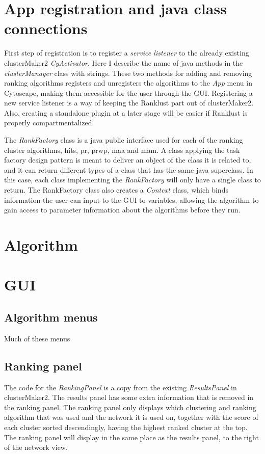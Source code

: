 \section{App registration and java class connections}
First step of registration is to register a \textit{service listener} to the
already existing clusterMaker2 \textit{CyActivator}. Here I describe the name
of java methods in the \textit{clusterManager} class with strings. These two
methods for adding and removing ranking algorithms registers and unregisters the
algorithms to the \textit{App} menu in Cytoscape, making them accessible for the
user through the GUI. Registering a new service listener is a way of keeping the
Ranklust part out of clusterMaker2. Also, creating a standalone plugin at
a later stage will be easier if Ranklust is properly compartmentalized.


The \textit{RankFactory} class is a java public interface used for each of the
ranking cluster algorithms, \gls{hits}, \gls{pr}, \gls{prwp}, \gls{maa} and \gls{mam}. A class applying the
task factory design pattern is meant to deliver an object of the class it is
related to\cite{factory-design}, and it can return different types of a class
that has the same java superclass\cite{java-superclass}. In this case, each
class implementing the \textit{RankFactory} will only have a single class to
return. The RankFactory class also creates a \textit{Context} class, which binds
information the user can input to the GUI to variables, allowing the algorithm
to gain access to parameter information about the algorithms before they run.

\section{Algorithm}
\section{GUI}
\subsection{Algorithm menus}
Much of these menus
\subsection{Ranking panel}
The code for the \textit{RankingPanel} is a copy from the existing
\textit{ResultsPanel} in clusterMaker2. The results panel has some extra
information that is removed in the ranking panel. The ranking panel only
displays which clustering and ranking algorithm that was used and the network it
is used on, together with the score of each cluster sorted descendingly, having
the highest ranked cluster at the top. The ranking panel will display in the
same place as the results panel, to the right of the network view.

